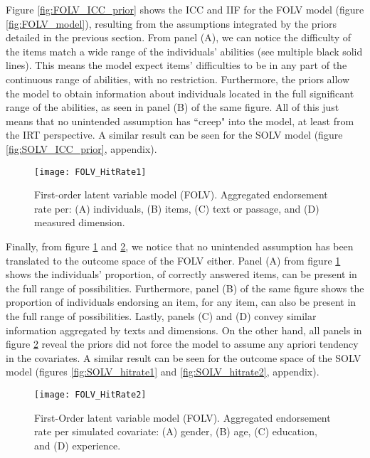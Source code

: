 Figure \ref{fig:FOLV_ICC_prior} shows the ICC and IIF for the FOLV model (figure \ref{fig:FOLV_model}), resulting from the assumptions integrated by the priors detailed in the previous section. From panel (A), we can notice the difficulty of the items match a wide range of the individuals' abilities (see multiple black solid lines). This means the model expect items' difficulties to be in any part of the continuous range of abilities, with no restriction. Furthermore, the priors allow the model to obtain information about individuals located in the full significant range of the abilities, as seen in panel (B) of the same figure. All of this just means that no unintended assumption has ``creep" into the model, at least from the IRT perspective. A similar result can be seen for the SOLV model (figure \ref{fig:SOLV_ICC_prior}, appendix).
%
\begin{figure}[H]
	\centering
	\texttt{[image: FOLV\_HitRate1]}
	\caption[First-order latent variable model (FOLV). Hit rate per dimensions of interest.]%
	{First-order latent variable model (FOLV). Aggregated endorsement rate per: (A) individuals, (B) items, (C) text or passage, and (D) measured dimension.}
	\label{fig:FOLV_hitrate1}
\end{figure}

Finally, from figure \ref{fig:FOLV_hitrate1} and \ref{fig:FOLV_hitrate2}, we notice that no unintended assumption has been translated to the outcome space of the FOLV either. Panel (A) from figure \ref{fig:FOLV_hitrate1} shows the individuals'  proportion, of correctly answered items, can be present in the full range of possibilities. Furthermore, panel (B) of the same figure shows the proportion of individuals endorsing an item, for any item, can also be present in the full range of possibilities. Lastly, panels (C) and (D) convey similar information aggregated by texts and dimensions. On the other hand, all panels in figure \ref{fig:FOLV_hitrate2} reveal the priors did not force the model to assume any apriori tendency in the covariates. A similar result can be seen for the outcome space of the SOLV model (figures \ref{fig:SOLV_hitrate1} and \ref{fig:SOLV_hitrate2}, appendix).
%
\begin{figure}[h]
	\centering
	\texttt{[image: FOLV\_HitRate2]}
	\caption[First-Order latent variable model (FOLV). Hit rate per simulated covariate.]%
	{First-Order latent variable model (FOLV). Aggregated endorsement rate per simulated covariate: (A) gender, (B) age, (C) education, and (D) experience.}
	\label{fig:FOLV_hitrate2}
\end{figure}

